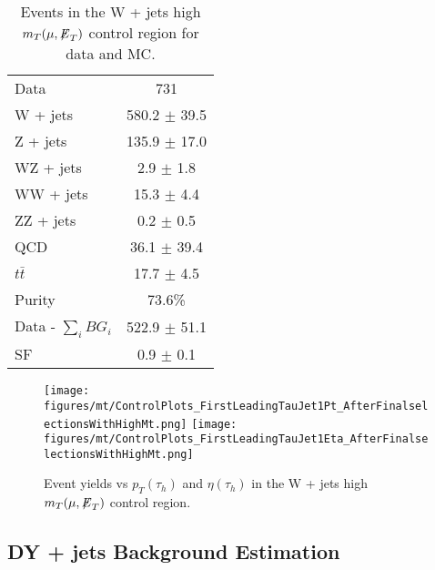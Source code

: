 \begin{table}[htbp!] 
\begin{center}
 \caption{ Events in the W + jets high $m_{T}(\mu,{\not\mathrel{E}}_T)$ control region for data and MC.}
 \begin{tabular}{| l | c |}
 \hline\hline
Data & 731 \\
W + jets & 580.2 $\pm$ 39.5 \\
Z + jets & 135.9 $\pm$ 17.0 \\
WZ + jets & 2.9 $\pm$ 1.8 \\
WW + jets & 15.3 $\pm$ 4.4 \\
ZZ + jets & 0.2 $\pm$ 0.5 \\
QCD & 36.1 $\pm$ 39.4 \\
$t\bar{t}$ & 17.7 $\pm$ 4.5 \\ \hline
Purity & 73.6\% \\
Data - $\sum\limits_{i} BG_{i}$ & 522.9 $\pm$ 51.1 \\ \hline
SF & 0.9 $\pm$ 0.1 \\
 \hline
 \hline
 \end{tabular}
 \label{tab:muTauHighMt}
\end{center}
\end{table}

\begin{figure}[thbp!]\centering 
  \texttt{[image: figures/mt/ControlPlots\_FirstLeadingTauJet1Pt\_AfterFinalselectionsWithHighMt.png]}
  \texttt{[image: figures/mt/ControlPlots\_FirstLeadingTauJet1Eta\_AfterFinalselectionsWithHighMt.png]} 
  \caption{\label{fig:muTauHighMtControlPlots} Event yields vs $p_{T}(\tau_{h})$ and $\eta(\tau_{h})$ in the W + jets high $m_{T}(\mu,{\not\mathrel{E}}_T)$ control region.}
\end{figure}

\subsection{DY + jets Background Estimation}

